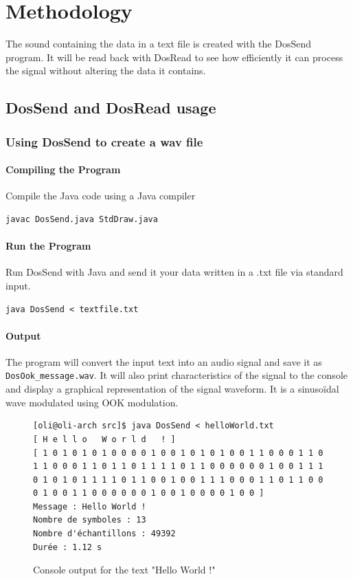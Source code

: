 \chapter{Methodology}

The sound containing the data in a text file is created with the DosSend program. It will be read back with DosRead to see how efficiently it can process the signal without altering the data it contains.

\section{DosSend and DosRead usage}

\subsection{Using DosSend to create a wav file}

\subsubsection{Compiling the Program}

Compile the Java code using a Java compiler

\begin{lstlisting}
javac DosSend.java StdDraw.java
\end{lstlisting}

\subsubsection{Run the Program}

Run DosSend with Java and send it your data written in a .txt file via standard input.

\begin{lstlisting}
java DosSend < textfile.txt
\end{lstlisting}

\subsubsection{Output}

The program will convert the input text into an audio signal and save it as \texttt{DosOok\_message.wav}. It will also print characteristics of the signal to the console and display a graphical representation of the signal waveform. It is a sinusoïdal wave modulated using OOK modulation.

\begin{figure}[!h]
	\begin{lstlisting}[style=console]
[oli@oli-arch src]$ java DosSend < helloWorld.txt
[ H e l l o   W o r l d   ! ]
[ 1 0 1 0 1 0 1 0 0 0 0 1 0 0 1 0 1 0 1 0 0 1 1 0 0 0 1 1 0 1 1 0 0 0 1 1 0 1 1 0 1 1 1 1 0 1 1 0 0 0 0 0 0 1 0 0 1 1 1 0 1 0 1 0 1 1 1 1 0 1 1 0 0 1 0 0 1 1 1 0 0 0 1 1 0 1 1 0 0 0 1 0 0 1 1 0 0 0 0 0 0 1 0 0 1 0 0 0 0 1 0 0 ]
Message : Hello World !
Nombre de symboles : 13
Nombre d'échantillons : 49392
Durée : 1.12 s
	\end{lstlisting}
	\caption{Console output for the text "Hello World !"}
\end{figure}

